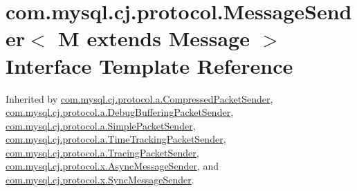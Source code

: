 \hypertarget{interfacecom_1_1mysql_1_1cj_1_1protocol_1_1_message_sender}{}\section{com.\+mysql.\+cj.\+protocol.\+Message\+Sender$<$ M extends Message $>$ Interface Template Reference}
\label{interfacecom_1_1mysql_1_1cj_1_1protocol_1_1_message_sender}


Inherited by \mbox{\hyperlink{classcom_1_1mysql_1_1cj_1_1protocol_1_1a_1_1_compressed_packet_sender}{com.\+mysql.\+cj.\+protocol.\+a.\+Compressed\+Packet\+Sender}}, \mbox{\hyperlink{classcom_1_1mysql_1_1cj_1_1protocol_1_1a_1_1_debug_buffering_packet_sender}{com.\+mysql.\+cj.\+protocol.\+a.\+Debug\+Buffering\+Packet\+Sender}}, \mbox{\hyperlink{classcom_1_1mysql_1_1cj_1_1protocol_1_1a_1_1_simple_packet_sender}{com.\+mysql.\+cj.\+protocol.\+a.\+Simple\+Packet\+Sender}}, \mbox{\hyperlink{classcom_1_1mysql_1_1cj_1_1protocol_1_1a_1_1_time_tracking_packet_sender}{com.\+mysql.\+cj.\+protocol.\+a.\+Time\+Tracking\+Packet\+Sender}}, \mbox{\hyperlink{classcom_1_1mysql_1_1cj_1_1protocol_1_1a_1_1_tracing_packet_sender}{com.\+mysql.\+cj.\+protocol.\+a.\+Tracing\+Packet\+Sender}}, \mbox{\hyperlink{classcom_1_1mysql_1_1cj_1_1protocol_1_1x_1_1_async_message_sender}{com.\+mysql.\+cj.\+protocol.\+x.\+Async\+Message\+Sender}}, and \mbox{\hyperlink{classcom_1_1mysql_1_1cj_1_1protocol_1_1x_1_1_sync_message_sender}{com.\+mysql.\+cj.\+protocol.\+x.\+Sync\+Message\+Sender}}.

